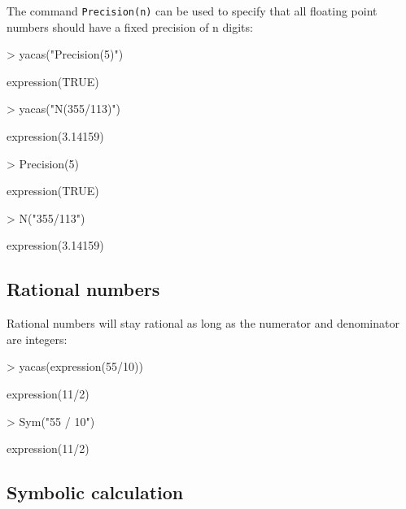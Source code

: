 \documentclass[]{article}
\newcommand{\code}[1]{{\tt #1}}
\begin{document}
The command \code{Precision(n)}
can be used to specify that all floating point numbers should have a
fixed precision of n digits:
\begin{Schunk}
\begin{Sinput}
> yacas("Precision(5)")
\end{Sinput}
\begin{Soutput}
expression(TRUE)
\end{Soutput}
\begin{Sinput}
> yacas("N(355/113)")
\end{Sinput}
\begin{Soutput}
expression(3.14159)
\end{Soutput}
\end{Schunk}

\begin{Schunk}
\begin{Sinput}
> Precision(5)
\end{Sinput}
\begin{Soutput}
expression(TRUE)
\end{Soutput}
\begin{Sinput}
> N("355/113")
\end{Sinput}
\begin{Soutput}
expression(3.14159)
\end{Soutput}
\end{Schunk}


\subsection{Rational numbers}

Rational numbers will stay rational as long as the numerator and
denominator are integers:
\begin{Schunk}
\begin{Sinput}
> yacas(expression(55/10))
\end{Sinput}
\begin{Soutput}
expression(11/2)
\end{Soutput}
\end{Schunk}

\begin{Schunk}
\begin{Sinput}
> Sym("55 / 10")
\end{Sinput}
\begin{Soutput}
expression(11/2)
\end{Soutput}
\end{Schunk}


\subsection{Symbolic calculation}
\label{sec:symbolicCalculation}
\end{document}
